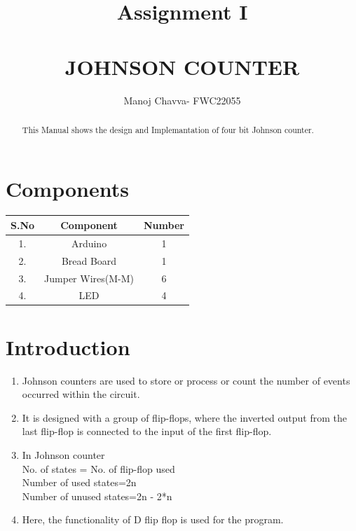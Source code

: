 \documentclass[journal,12pt,twocolumn]{IEEEtran}
\title{Assignment \textrm{I} \\ \textbf{\\JOHNSON COUNTER}}
\author{Manoj Chavva- FWC22055}
\begin{document}
\maketitle

\tableofcontents
\vspace{0.5cm}
\begin{abstract}
  This Manual shows the design and Implemantation of four bit Johnson counter.
\end{abstract}   


 
     \section{Components}  
       

\begin{tabular}{|c|c|c|}
    \hline 
      \textbf{S.No} & \textbf{Component} & \textbf{Number}\\
      \hline
	1. & Arduino & 1 \\
	2. & Bread Board & 1 \\
	3. & Jumper Wires(M-M) & 6 \\
	4. & LED & 4 \\
	
      \hline
      
   \end{tabular}
   

     \vspace{0.35cm}




\section{Introduction}
\begin{enumerate}
  \item Johnson counters are used to store or process or count the number of events occurred within the circuit.
  \item It is designed with a group of flip-flops, where the inverted output from the last flip-flop is connected to the input of the first flip-flop.
  \item In Johnson counter
  \\No. of states = No. of flip-flop used  
\\Number of used states=2n  
\\Number of unused states=2n - 2*n  
\item Here, the functionality of D flip flop is used for the program. 
\end{enumerate}
\end{document}
